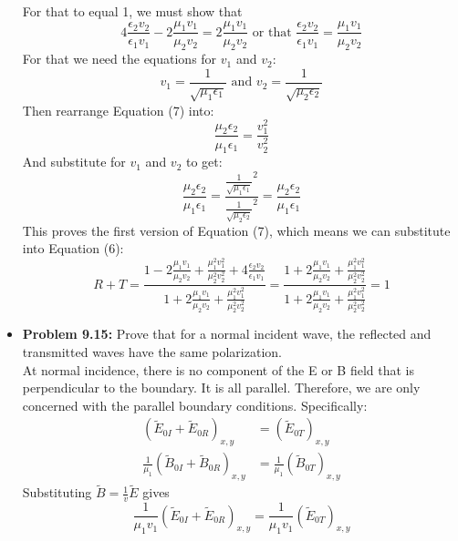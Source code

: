 \documentclass{report}
\begin{document}
\begin{itemize}
\begin{equation}
\end{equation}
For that to equal 1, we must show that
\begin{equation}
  4\frac{\epsilon_2v_2}{\epsilon_1v_1}-2\frac{\mu_1v_1}{\mu_2v_2}=2\frac{\mu_1v_1}{\mu_2v_2} \text{ or that } \frac{\epsilon_2v_2}{\epsilon_1v_1}=\frac{\mu_1v_1}{\mu_2v_2}
\end{equation}
For that we need the equations for $v_1$ and $v_2$:
\begin{equation}
  v_1 = \frac{1}{\sqrt{\mu_1\epsilon_1}} \text{ and } v_2 = \frac{1}{\sqrt{\mu_2\epsilon_2}}
\end{equation}
Then rearrange Equation (7) into:
\begin{equation}
  \frac{\mu_2\epsilon_2}{\mu_1\epsilon_1} = \frac{v_1^2}{v_2^2}
\end{equation}
And substitute for $v_1$ and $v_2$ to get:
\begin{equation}
  \frac{\mu_2\epsilon_2}{\mu_1\epsilon_1} = \frac{\frac{1}{\sqrt{\mu_1\epsilon_1}}^2}{\frac{1}{\sqrt{\mu_2\epsilon_2}}^2} = \frac{\mu_2\epsilon_2}{\mu_1\epsilon_1}
\end{equation}
This proves the first version of Equation (7), which means we can substitute into Equation (6):
\begin{equation}
  R+T=\frac{1-2\frac{\mu_1v_1}{\mu_2v_2}+\frac{\mu_1^2v_1^2}{\mu_2^2v_2^2}+4\frac{\epsilon_2v_2}{\epsilon_1v_1}}{1+2\frac{\mu_1v_1}{\mu_2v_2}+\frac{\mu_1^2v_1^2}{\mu_2^2v_2^2}} = \frac{1+2\frac{\mu_1v_1}{\mu_2v_2}+\frac{\mu_1^2v_1^2}{\mu_2^2v_2^2}}{1+2\frac{\mu_1v_1}{\mu_2v_2}+\frac{\mu_1^2v_1^2}{\mu_2^2v_2^2}} = 1
\end{equation}
\item \textbf{Problem 9.15:} Prove that for a normal incident wave, the reflected and transmitted waves have the same polarization.\\ \newline
At normal incidence, there is no component of the E or B field that is perpendicular to the boundary.
It is all parallel. Therefore, we are only concerned with the parallel boundary conditions. Specifically:
\begin{align}
(\tilde{E}_{0I}+\tilde{E}_{0R})_{x,y} & = (\tilde{E}_{0T})_{x,y}\\
\frac{1}{\mu_1}(\tilde{B}_{0I}+\tilde{B}_{0R})_{x,y} & = \frac{1}{\mu_1}(\tilde{B}_{0T})_{x,y}
\end{align}
Substituting $\tilde{B}=\frac{1}{v}\tilde{E}$ gives
\begin{equation}
  \frac{1}{\mu_1v_1}(\tilde{E}_{0I}+\tilde{E}_{0R})_{x,y}  = \frac{1}{\mu_1v_1}(\tilde{E}_{0T})_{x,y}

\end{equation}
\end{itemize}
\end{document}
